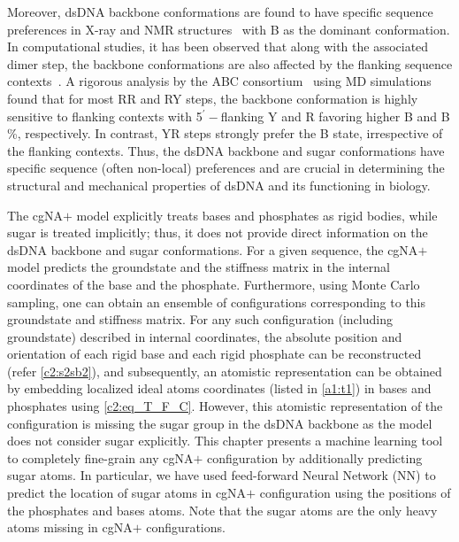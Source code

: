 Moreover, dsDNA backbone conformations are found to have specific sequence preferences in X-ray and NMR structures~\cite{djuranovic2004dna,svozil2008dna,yanagi1991analysis,heddi2010intrinsic,packer1998sequence} with B as the dominant conformation.
In computational studies, it has been observed that along with the associated dimer step, the backbone conformations are also affected by the flanking sequence contexts~\cite{hartmann1993b,bertrand1998flexibility,pasi2014muabc,dans2014unraveling,da2021sequence}.
A rigorous analysis by the ABC consortium~\cite{pasi2014muabc} using MD simulations found that for most RR and RY steps, the backbone conformation is highly sensitive to flanking contexts with 5$^\prime-$flanking Y and R favoring higher B and B \%, respectively.
In contrast, YR steps strongly prefer the B state, irrespective of the flanking contexts.
Thus, the dsDNA backbone and sugar conformations have specific sequence (often non-local) preferences and are crucial in determining the structural and mechanical properties of dsDNA and its functioning in biology.

The cgNA$+$ model explicitly treats bases and phosphates as rigid bodies, while sugar is treated implicitly; thus, it does not provide direct information on the dsDNA backbone and sugar conformations.
For a given sequence, the cgNA$+$ model predicts the groundstate and the stiffness matrix in the internal coordinates of the base and the phosphate.
Furthermore, using Monte Carlo sampling, one can obtain an ensemble of configurations corresponding to this groundstate and stiffness matrix.
For any such configuration (including groundstate) described in internal coordinates, the absolute position and orientation of each rigid base and each rigid phosphate can be reconstructed (refer \cref{c2:s2sb2}), and subsequently, an atomistic representation can be obtained by embedding localized ideal atoms coordinates (listed in \cref{a1:t1}) in bases and phosphates using \cref{c2:eq_T_F_C}.
However, this atomistic representation of the configuration is missing the sugar group in the dsDNA backbone as the model does not consider sugar explicitly.
This chapter presents a machine learning tool to completely fine-grain any cgNA$+$ configuration by additionally predicting sugar atoms.
In particular, we have used feed-forward Neural Network (NN) to predict the location of sugar atoms in cgNA$+$ configuration using the positions of the phosphates and bases atoms.
Note that the sugar atoms are the only heavy atoms missing in cgNA$+$ configurations.

